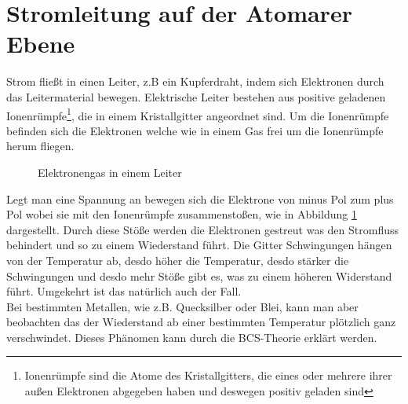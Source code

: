 \section{Stromleitung auf der Atomarer Ebene}
Strom fließt in einen Leiter, z.B ein Kupferdraht, indem sich Elektronen durch das Leitermaterial
bewegen. Elektrische Leiter bestehen aus positive geladenen Ionenrümpfe\footnote{Ionenrümpfe sind die Atome des Kristallgitters, die eines oder mehrere ihrer außen Elektronen abgegeben haben und deswegen positiv geladen sind}, die in einem Kristallgitter angeordnet sind. Um 
die Ionenrümpfe befinden sich die Elektronen welche wie in einem Gas frei um die Ionenrümpfe herum fliegen.


\begin{figure}[h]
    
    \centering
    \caption{Elektronengas in einem Leiter}
    \label{fig:Elektronengas}
\end{figure}
Legt man eine Spannung an bewegen sich die Elektrone von minus Pol zum plus Pol 
wobei sie mit den Ionenrümpfe zusammenstoßen, wie in Abbildung \ref{fig:Elektronengas} dargestellt.
Durch diese Stöße werden die Elektronen gestreut was den Stromfluss behindert und so zu einem Wiederstand führt. Die Gitter Schwingungen 
hängen von der Temperatur ab, desdo höher die Temperatur, desdo stärker die Schwingungen und desdo mehr Stöße gibt es, was zu einem höheren
Widerstand führt. Umgekehrt ist das natürlich 
auch der Fall. \\

Bei bestimmten Metallen, wie z.B. Quecksilber oder Blei, kann man aber beobachten das der Wiederstand ab einer bestimmten 
Temperatur plötzlich ganz verschwindet. Dieses Phänomen kann durch die BCS-Theorie erklärt werden.